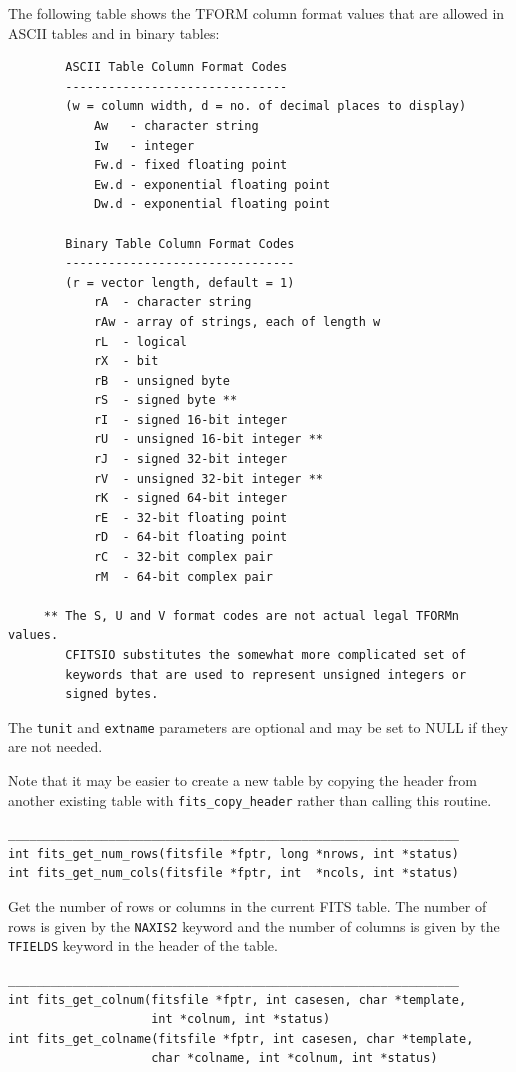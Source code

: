 \documentclass[11pt]{article}
\begin{document}
The following table
shows the TFORM column format values that are allowed in ASCII tables
and in binary tables:
\begin{verbatim}
        ASCII Table Column Format Codes
        -------------------------------
        (w = column width, d = no. of decimal places to display)
            Aw   - character string
            Iw   - integer
            Fw.d - fixed floating point
            Ew.d - exponential floating point
            Dw.d - exponential floating point

        Binary Table Column Format Codes
        --------------------------------
        (r = vector length, default = 1)
            rA  - character string
            rAw - array of strings, each of length w
            rL  - logical
            rX  - bit
            rB  - unsigned byte
            rS  - signed byte **
            rI  - signed 16-bit integer
            rU  - unsigned 16-bit integer **
            rJ  - signed 32-bit integer
            rV  - unsigned 32-bit integer **
            rK  - signed 64-bit integer
            rE  - 32-bit floating point
            rD  - 64-bit floating point
            rC  - 32-bit complex pair
            rM  - 64-bit complex pair

     ** The S, U and V format codes are not actual legal TFORMn values.
        CFITSIO substitutes the somewhat more complicated set of
        keywords that are used to represent unsigned integers or
        signed bytes.

\end{verbatim}
  
The {\tt tunit} and {\tt extname} parameters are optional and
may be set to NULL
if they are not needed.  

Note that it may be easier to create a new table by copying the
header from another existing table with {\tt fits\_copy\_header} rather
than calling this routine.

\begin{verbatim}
_______________________________________________________________
int fits_get_num_rows(fitsfile *fptr, long *nrows, int *status)
int fits_get_num_cols(fitsfile *fptr, int  *ncols, int *status)
\end{verbatim}

Get the number of rows or columns in the current FITS table.  The
number of rows is given by the {\tt NAXIS2} keyword and the number of columns
is given by the {\tt TFIELDS} keyword in the header of the table.

\begin{verbatim}
_______________________________________________________________
int fits_get_colnum(fitsfile *fptr, int casesen, char *template,
                    int *colnum, int *status)
int fits_get_colname(fitsfile *fptr, int casesen, char *template,
                    char *colname, int *colnum, int *status)
\end{verbatim}
\end{document}
